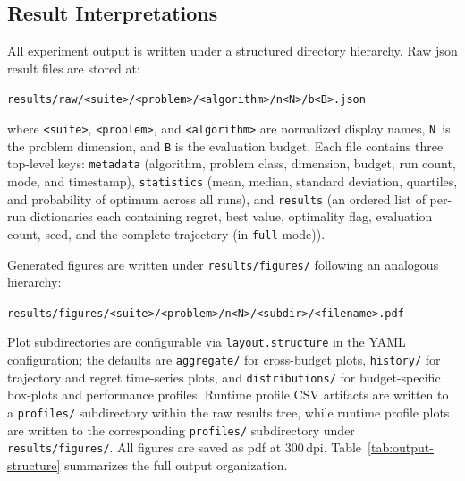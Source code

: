 \subsection{Result Interpretations}
\label{subsec:resint}

All experiment output is written under a structured directory hierarchy.
Raw \acrshort{json} result files are stored at:

\texttt{results/raw/<suite>/<problem>/<algorithm>/n<N>/b<B>.json}

\noindent where \texttt{<suite>}, \texttt{<problem>}, and
\texttt{<algorithm>} are
normalized display names, \texttt{N}~is the problem dimension, and \texttt{B}
is the evaluation budget. Each file contains three top-level keys:
\texttt{metadata} (algorithm, problem class, dimension, budget, run count,
mode, and timestamp), \texttt{statistics} (mean, median, standard deviation,
quartiles, and probability of optimum across all runs), and \texttt{results}
(an ordered list of per-run dictionaries each containing regret, best value,
  optimality flag, evaluation count, seed, and the complete trajectory
(in \texttt{full} mode)).

Generated figures are written under \texttt{results/figures/} following an
analogous hierarchy:

\texttt{results/figures/<suite>/<problem>/n<N>/<subdir>/<filename>.pdf}

\noindent Plot subdirectories are configurable via
\texttt{layout.structure} in the YAML
configuration; the defaults are \texttt{aggregate/} for cross-budget plots,
\texttt{history/} for trajectory and regret time-series plots, and
\texttt{distributions/} for budget-specific box-plots and performance profiles.
Runtime profile CSV artifacts are written to a \texttt{profiles/} subdirectory
within the raw results tree, while runtime profile plots are written to the
corresponding \texttt{profiles/} subdirectory under \texttt{results/figures/}.
All figures are saved as \acrshort{pdf} at 300\,\acrshort{dpi}.
Table~\ref{tab:output-structure} summarizes the full output organization.

